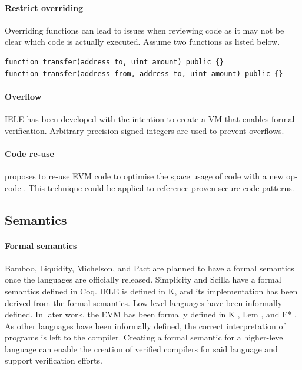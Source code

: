 \paragraph{Restrict overriding}
Overriding functions can lead to issues when reviewing code as it may not be clear which code is actually executed. Assume two functions as listed below.
\begin{lstlisting}[caption={Function overriding with different inputs.},label=lst:tail-call,language=Solidity]
function transfer(address to, uint amount) public {}
function transfer(address from, address to, uint amount) public {}
\end{lstlisting}

\paragraph{Overflow}
IELE has been developed with the intention to create a VM that enables formal verification. Arbitrary-precision signed integers are used to prevent overflows.

\paragraph{Code re-use}
\citeauthor{Pontiveros2018} proposes to re-use EVM code to optimise the space usage of code with a new op-code \cite{Pontiveros2018}. This technique could be applied to reference proven secure code patterns.

\subsection{Semantics}

\paragraph{Formal semantics}
Bamboo, Liquidity, Michelson, and Pact are planned to have a formal semantics once the languages are officially released.  Simplicity and Scilla have a formal semantics defined in Coq. IELE is defined in K, and its implementation has been derived from the formal semantics.
Low-level languages have been informally defined. In later work, the EVM has been formally defined in K \cite{Hildenbrandt2017}, Lem \cite{Hirai2017}, and F* \cite{Grishchenko2018}.
As other languages have been informally defined, the correct interpretation of programs is left to the compiler. Creating a formal semantic for a higher-level language can enable the creation of verified compilers for said language and support verification efforts.

